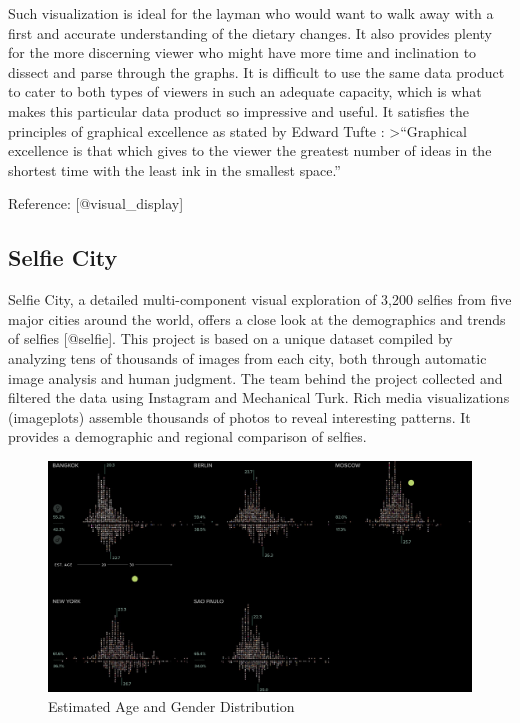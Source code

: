 \documentclass[]{book}
\theoremstyle{definition}
\theoremstyle{definition}
\theoremstyle{definition}
\theoremstyle{remark}
\begin{document}
Such visualization is ideal for the layman who would want to walk away
with a first and accurate understanding of the dietary changes. It also
provides plenty for the more discerning viewer who might have more time
and inclination to dissect and parse through the graphs. It is difficult
to use the same data product to cater to both types of viewers in such
an adequate capacity, which is what makes this particular data product
so impressive and useful. It satisfies the principles of graphical
excellence as stated by Edward Tufte : \textgreater{}``Graphical
excellence is that which gives to the viewer the greatest number of
ideas in the shortest time with the least ink in the smallest space.''

Reference: {[}@visual\_display{]}

\subsection{Selfie City}\label{selfie-city}

Selfie City, a detailed multi-component visual exploration of 3,200
selfies from five major cities around the world, offers a close look at
the demographics and trends of selfies {[}@selfie{]}. This project is
based on a unique dataset compiled by analyzing tens of thousands of
images from each city, both through automatic image analysis and human
judgment. The team behind the project collected and filtered the data
using Instagram and Mechanical Turk. Rich media visualizations
(imageplots) assemble thousands of photos to reveal interesting
patterns. It provides a demographic and regional comparison of selfies.

\begin{figure}
\centering
\includegraphics{images/selfie_age_gender.png}
\caption{Estimated Age and Gender Distribution}
\end{figure}
\end{document}
